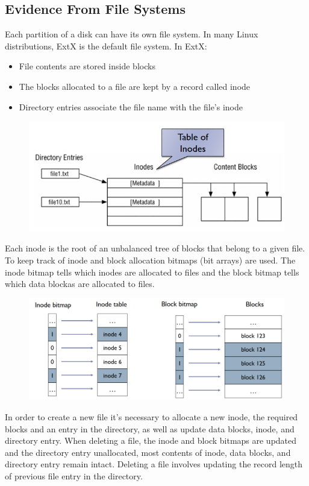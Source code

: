 \documentclass[10pt,a4paper]{report}
\begin{document}
\subsection{Evidence From File Systems}
Each partition of a disk can have its own file system. In many Linux distributions, ExtX is the default file system. In ExtX:
\begin{itemize}
\item File contents are stored inside blocks
\item The blocks allocated to a file are kept by a record called inode
\item Directory entries associate the file name with the file’s inode
\end{itemize}
\begin{figure}[H]
\centering
\includegraphics[scale=0.5]{11.png}
\end{figure}
Each inode is the root of an unbalanced tree of blocks that belong to a given file. To keep track of inode and block allocation bitmaps (bit arrays) are used. The inode bitmap tells which inodes are allocated to files and the block bitmap tells which data blockas are allocated to files.
\begin{figure}[H]
\centering
\includegraphics[scale=0.4]{30.png}
\end{figure}
In order to create a new file it's necessary to allocate a new inode, the required blocks and an entry in the directory, as well as update data blocks, inode, and directory entry. When deleting a file, the inode and block bitmaps are updated and the directory entry unallocated, most contents of inode, data blocks, and directory entry remain intact. Deleting a file involves updating the record length of previous file entry in the directory.\\
\end{document}
